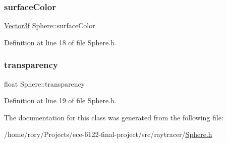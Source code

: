\subsubsection{\texorpdfstring{surface\+Color}{surfaceColor}}
{\footnotesize\ttfamily \hyperlink{_vector3_8h_af345ad77ba5e240c7ab72b4b2077e754}{Vector3f} Sphere\+::surface\+Color}



Definition at line 18 of file Sphere.\+h.

\mbox{\label{class_sphere_a93f7757b497ba9f0f93b9927e5d96e5d}} 
\subsubsection{\texorpdfstring{transparency}{transparency}}
{\footnotesize\ttfamily float Sphere\+::transparency}



Definition at line 19 of file Sphere.\+h.



The documentation for this class was generated from the following file\+:\begin{DoxyCompactItemize}
\item 
/home/rory/\+Projects/ece-\/6122-\/final-\/project/src/raytracer/\hyperlink{_sphere_8h}{Sphere.\+h}\end{DoxyCompactItemize}
